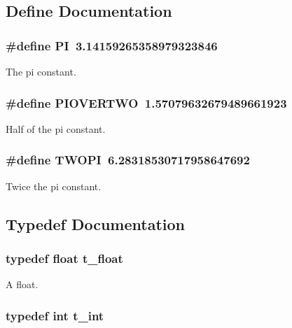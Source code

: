 \subsection{Define Documentation}
\hypertarget{group__msp_ga598a3330b3c21701223ee0ca14316eca}{
\subsubsection[{PI}]{\setlength{\rightskip}{0pt plus 5cm}\#define PI~3.14159265358979323846}}
\label{group__msp_ga598a3330b3c21701223ee0ca14316eca}


The pi constant. \hypertarget{group__msp_ga54195c4fca76460ca07ba5101bcbc780}{
\subsubsection[{PIOVERTWO}]{\setlength{\rightskip}{0pt plus 5cm}\#define PIOVERTWO~1.57079632679489661923}}
\label{group__msp_ga54195c4fca76460ca07ba5101bcbc780}


Half of the pi constant. \hypertarget{group__msp_ga4912c64aec0c943b7985db6cb61ff83a}{
\subsubsection[{TWOPI}]{\setlength{\rightskip}{0pt plus 5cm}\#define TWOPI~6.28318530717958647692}}
\label{group__msp_ga4912c64aec0c943b7985db6cb61ff83a}


Twice the pi constant. 

\subsection{Typedef Documentation}
\hypertarget{group__msp_gab68e234c9dccbd3d62659023db9f9486}{
\subsubsection[{t\_\-float}]{\setlength{\rightskip}{0pt plus 5cm}typedef float {\bf t\_\-float}}}
\label{group__msp_gab68e234c9dccbd3d62659023db9f9486}


A float. \hypertarget{group__msp_gaaca420c8a41d33afb2f9e783ce6059e3}{
\subsubsection[{t\_\-int}]{\setlength{\rightskip}{0pt plus 5cm}typedef int {\bf t\_\-int}}}
\label{group__msp_gaaca420c8a41d33afb2f9e783ce6059e3}


